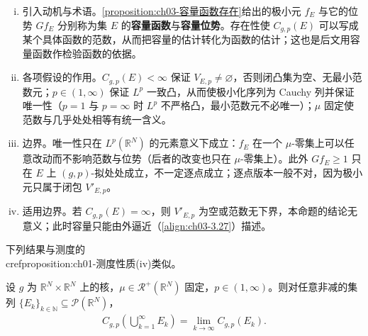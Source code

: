 \documentclass[../../main.tex]{subfiles}%
\begin{document}
\begin{remark}\label{remark:ch03-容量函数存在}
\begin{enumerate}[(i)]
\item 引入动机与术语。\cref{proposition:ch03-容量函数存在}给出的极小元 $f_E$ 与它的位势 $Gf_E$ 分别称为集 $E$ 的\textbf{容量函数}与\textbf{容量位势}。存在性使 $C_{g,p}(E)$ 可以写成某个具体函数的范数，从而把容量的估计转化为函数的估计；这也是后文用容量函数作检验函数的依据。

\item 各项假设的作用。$C_{g,p}(E)<\infty$ 保证 $V_{E,p}\neq\varnothing$，否则闭凸集为空、无最小范数元；$p\in(1,\infty)$ 保证 $L^p$ 一致凸，从而使极小化序列为 Cauchy 列并保证唯一性（$p=1$ 与 $p=\infty$ 时 $L^p$ 不严格凸，最小范数元不必唯一）；$\mu$ 固定使范数与几乎处处相等有统一含义。

\item 边界。唯一性只在 $L^p(\mathbb{R}^N)$ 的元素意义下成立：$f_E$ 在一个 $\mu$-零集上可以任意改动而不影响范数与位势（后者的改变也只在 $\mu$-零集上）。此外 $Gf_E\geqslant1$ 只在 $E$ 上 $(g,p)$-拟处处成立，不一定逐点成立；逐点版本一般不对，因为极小元只属于闭包 $V'_{E,p}$。

\item 适用边界。若 $C_{g,p}(E)=\infty$，则 $V'_{E,p}$ 为空或范数无下界，本命题的结论无意义；此时容量只能由外逼近（\eqref{align:ch03-3.27}）描述。
\end{enumerate}
\end{remark}

下列结果与测度的\\cref{proposition:ch01-测度性质}(iv)类似。

\begin{proposition}\label{proposition:ch03-下连续}
设 $g$ 为 $\mathbb{R}^N\times\mathbb{R}^N$ 上的核，$\mu\in\mathscr{R}^+(\mathbb{R}^N)$ 固定，$p\in(1,\infty)$。则对任意非减的集列 $\{E_k\}_{k\in\mathbb{N}}\subseteq\mathcal{P}(\mathbb{R}^N)$，
\begin{align}
C_{g,p}\left(\bigcup_{k=1}^\infty E_k\right)=\lim_{k\to\infty}C_{g,p}(E_k).\label{align:ch03-3.29}
\end{align}
\end{proposition}
\end{document}
